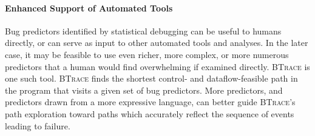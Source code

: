 \paragraph{Enhanced Support of Automated Tools}

Bug predictors identified by statistical debugging can be useful to humans directly, or can serve as input to other automated tools and analyses.  In the later case, it may be feasible to use even richer, more complex, or more numerous predictors that a human would find overwhelming if examined directly.  \textsc{BTrace} \cite{Lal:2006:POPAD} is one such tool. \textsc{BTrace} finds the shortest control- and dataflow-feasible path in the program that visits a given set of bug predictors.  More predictors, and predictors drawn from a more expressive language, can better guide \textsc{BTrace}'s path exploration toward paths which accurately reflect the sequence of events leading to failure.

